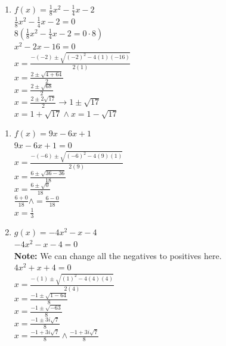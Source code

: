\begin{example}
\begin{enumerate}
    $x = \frac{-1 \pm \sqrt{7}}{6}$ \\
    $x = \frac{-1 + \sqrt{7}}{6} \land x = \frac{-1 + \sqrt{7}}{6}$
  \item $f(x) = \frac{1}{8}x^2 - \frac{1}{4}x - 2$ \\
    $\frac{1}{8}x^2 - \frac{1}{4}x - 2 = 0$ \\
    $8(\frac{1}{8}x^2 - \frac{1}{4}x - 2 = 0 \cdot 8)$ \\
    $x^2 - 2x - 16 = 0$ \\
    $x = \frac{-(-2) \pm \sqrt{(-2)^2 - 4 (1)(-16)}}{2 (1)}$ \\
    $x = \frac{2 \pm \sqrt{4 + 64}}{2}$ \\
    $x = \frac{2 \pm \sqrt{68}}{2}$ \\
    $x = \frac{2 \pm 2\sqrt{17}}{2} \to 1 \pm \sqrt{17}$ \\
    $x = 1 + \sqrt{17} \land x = 1 - \sqrt{17}$
  \end{enumerate}
\end{example}

\begin{example}
  \hfill
  \begin{enumerate}
  \item $f(x) = 9x - 6x + 1$ \\
    $9x - 6x + 1 = 0$ \\
    $x = \frac{-(-6) \pm \sqrt{(-6)^2 - 4 (9)(1)}}{2 (9)}$ \\
    $x = \frac{6 \pm \sqrt{36 - 36}}{18}$ \\
    $x = \frac{6 \pm \sqrt{0}}{18}$ \\
    $ \frac{6 + 0}{18} \land = \frac{6 - 0}{18}$ \\
    $x = \frac{1}{3}$
  \item $g(x) = -4x^2 - x - 4$ \\
    $-4x^2 - x - 4 = 0$ \\
    \textbf{Note: }We can change all the negatives to positives here. \\
    $4x^2 + x + 4 = 0$ \\
    $x = \frac{-(1) \pm \sqrt{(1)^2 - 4 (4)(4)}}{2 (4)}$ \\
    $x = \frac{-1 \pm \sqrt{1 - 64}}{8}$ \\
    $x = \frac{-1 \pm \sqrt{-63}}{8} $ \\
    $x = \frac{-1 \pm 3i\sqrt{7}}{8}$ \\
    $x = \frac{-1 + 3i\sqrt{7}}{8} \land \frac{-1 + 3i\sqrt{7}}{8}$
  \end{enumerate}

\end{example}
